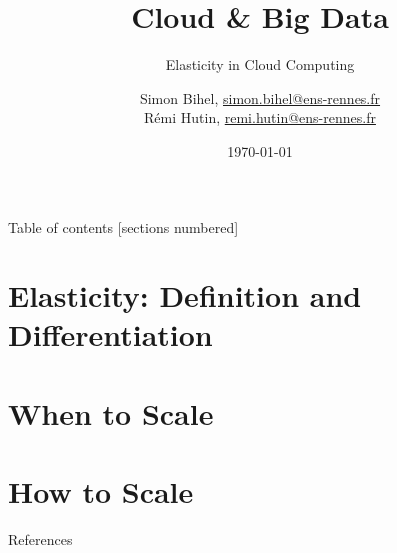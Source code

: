 \documentclass{beamer}
\title{Cloud \& Big Data}
\subtitle{Elasticity in Cloud Computing}
\date{\today}
\author{%
  Simon Bihel, \url{simon.bihel@ens-rennes.fr} \\
  Rémi Hutin, \url{remi.hutin@ens-rennes.fr}
}
\institute{%
  University of Rennes I \\
  École normale supérieure de Rennes
}
\begin{document}
\maketitle

\begin{frame}{Table of contents}
  [sections numbered]
  \tableofcontents[hideallsubsections]
\end{frame}

\section{Elasticity: Definition and Differentiation}

\section{When to Scale}

\section{How to Scale}

\begin{frame}[allowframebreaks]{References}
  
  
\end{frame}
\end{document}
